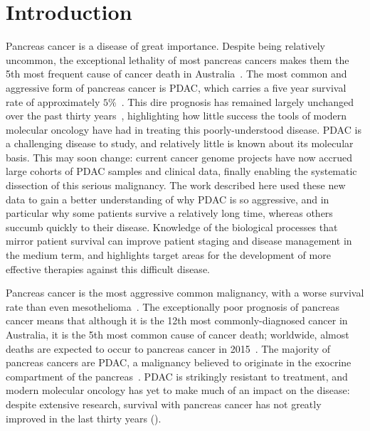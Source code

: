 \documentclass[thesis.tex]{subfiles}
\begin{document}
\chapter[Introduction]{Introduction}
\label{chap:intro}

Pancreas cancer is a disease of great importance.  Despite being relatively uncommon, the exceptional lethality of most pancreas cancers makes them the 5th most frequent cause of cancer death in Australia~\cite{CAN88}.  The most common and aggressive form of pancreas cancer is \gls{PDAC}, which carries a five year survival rate of approximately $5\%$~\cite{CAN65}.  This dire prognosis has remained largely unchanged over the past thirty years~\cite{CAN65, SEER2014}, highlighting how little success the tools of modern molecular oncology have had in treating this poorly-understood disease.  \gls{PDAC} is a challenging disease to study, and relatively little is known about its molecular basis.  This may soon change: current cancer genome projects have now accrued large cohorts of \gls{PDAC} samples and clinical data, finally enabling the systematic dissection of this serious malignancy.  The work described here used these new data to gain a better understanding of why \gls{PDAC} is so aggressive, and in particular why some patients survive a relatively long time, whereas others succumb quickly to their disease.  Knowledge of the biological processes that mirror patient survival can improve patient staging and disease management in the medium term, and highlights target areas for the development of more effective therapies against this difficult disease.

Pancreas cancer is the most aggressive common malignancy, with a worse survival rate than even mesothelioma~\cite{CAN65}.  The exceptionally poor prognosis of pancreas cancer means that although it is the 12th most commonly-diagnosed cancer in Australia, it is the 5th most common cause of cancer death; worldwide, almost  deaths are expected to occur to pancreas cancer in 2015~\cite{GLOBOCAN2015}.
The majority of pancreas cancers are \gls{PDAC}, a malignancy believed to originate in the exocrine compartment of the pancreas~\cite{Ryan2014}.  \gls{PDAC} is strikingly resistant to treatment, and modern molecular oncology has yet to make much of an impact on the disease: despite extensive research, survival with pancreas cancer has not greatly improved in the last thirty years ().
\end{document}
